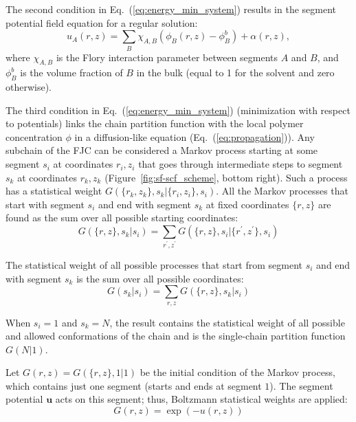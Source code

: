 \documentclass[10pt, a4paper]{article}
\begin{document}
\begin{multicols}{2}
The second condition in Eq.~(\ref{eq:energy_min_system}) results in the segment potential field equation for a regular solution:
\begin{equation}
    \label{eq:u-phi}
    u_A(r, z) =\sum\limits_{B} \chi_{A,B} \left(\phi_B(r,z) - \phi_B^b \right) + \alpha(r, z),
\end{equation}
where $\chi_{A,B}$ is the Flory interaction parameter between segments $A$ and $B$, and $\phi_B^b$ is the volume fraction of $B$ in the bulk (equal to 1 for the solvent and zero otherwise).

The third condition in Eq.~(\ref{eq:energy_min_system}) (minimization with respect to potentials) links the chain partition function with the local polymer concentration $\phi$ in a diffusion-like equation (Eq.~(\ref{eq:propagation})).
Any subchain of the FJC can be considered a Markov process starting at some segment $s_i$ at coordinates $r_i, z_i$ that goes through intermediate steps to segment $s_k$ at coordinates $r_k, z_k$ (Figure~\ref{fig:sf-scf_scheme}, bottom right).
Such a process has a statistical weight $G(\{r_k, z_k\}, s_k | \{r_i, z_i\}, s_i)$.
All the Markov processes that start with segment $s_i$ and end with segment $s_k$ at fixed coordinates $\{r, z\}$ are found as the sum over all possible starting coordinates:
\begin{equation}
    \label{eq:sum_to_phi}
    G(\{r, z\}, s_k | s_i) = \sum_{r^{\prime}, z^{\prime}} G(\{r, z\}, s_i | \{r^{\prime}, z^{\prime}\}, s_i)
\end{equation}


The statistical weight of all possible processes that start from segment $s_i$ and end with segment $s_k$ is the sum over all possible coordinates:
\begin{equation}
    G(s_k | s_i) = \sum_{r, z} G(\{r, z\}, s_k | s_i)
\end{equation}

When $s_i=1$ and $s_k=N$, the result contains the statistical weight of all possible and allowed conformations of the chain and is the single-chain partition function $G(N|1)$.

Let $G(r, z) = G(\{r, z\}, 1|1)$ be the initial condition of the Markov process, which contains just one segment (starts and ends at segment $1$).
The segment potential $\mathbf{u}$ acts on this segment; thus, Boltzmann statistical weights are applied:
\begin{equation}
    G(r, z) = \exp(-u(r,z))
\end{equation}


\end{multicols}
\end{document}
